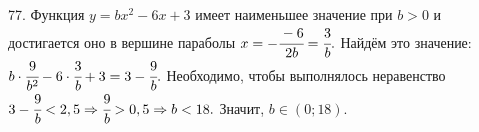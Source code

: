 77. Функция $y=bx^2-6x+3$ имеет наименьшее значение при $b>0$ и достигается оно в вершине параболы $x=-\cfrac{-6}{2b}=\cfrac{3}{b}.$ Найдём это значение: $b\cdot\cfrac{9}{b^2}-6\cdot\cfrac{3}{b}+3=3-\cfrac{9}{b}.$ Необходимо, чтобы выполнялось неравенство $3-\cfrac{9}{b}<2,5\Rightarrow\cfrac{9}{b}>0,5
\Rightarrow b<18.$ Значит, $b\in(0;18).$\\
